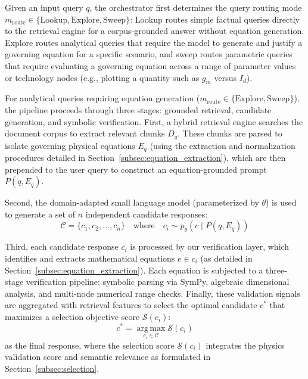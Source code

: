 \documentclass[a4paper,fleqn]{cas-sc}
\begin{document}
Given an input query $q$, the orchestrator first determines the query routing mode $m_{\mathrm{route}} \in \{\text{Lookup}, \text{Explore}, \text{Sweep}\}$: Lookup routes simple factual queries directly to the retrieval engine for a corpus-grounded answer without equation generation. Explore routes analytical queries that require the model to generate and justify a governing equation for a specific scenario, and sweep routes parametric queries that require evaluating a governing equation across a range of parameter values or technology nodes (e.g., plotting a quantity such as $g_m$ versus $I_d$).

For analytical queries requiring equation generation ($m_{\mathrm{route}} \in \{\text{Explore}, \text{Sweep}\}$), the pipeline proceeds through three stages: grounded retrieval, candidate generation, and symbolic verification. First, a hybrid retrieval engine searches the document corpus to extract relevant chunks $D_q$. These chunks are parsed to isolate governing physical equations $E_q$ (using the extraction and normalization procedures detailed in Section~\ref{subsec:equation_extraction}), which are then prepended to the user query to construct an equation-grounded prompt $P(q, E_q)$.

Second, the domain-adapted small language model (parameterized by $\theta$) is used to generate a set of $n$ independent candidate responses:
\begin{equation*}
\mathcal{C} = \{c_1, c_2, \dots, c_n\} \quad \text{where} \quad c_i \sim p_{\theta}(c \mid P(q, E_q))
\end{equation*}

Third, each candidate response $c_i$ is processed by our verification layer, which identifies and extracts mathematical equations $e \in c_i$ (as detailed in Section~\ref{subsec:equation_extraction}). Each equation is subjected to a three-stage verification pipeline: symbolic parsing via SymPy, algebraic dimensional analysis, and multi-node numerical range checks. Finally, these validation signals are aggregated with retrieval features to select the optimal candidate $c^*$ that maximizes a selection objective score $\mathcal{S}(c_i)$:
\begin{equation*}
c^* = \operatorname*{arg\,max}_{c_i \in \mathcal{C}} \mathcal{S}(c_i)
\end{equation*}
as the final response, where the selection score $\mathcal{S}(c_i)$ integrates the physics validation score and semantic relevance as formulated in Section~\ref{subsec:selection}.
\end{document}
